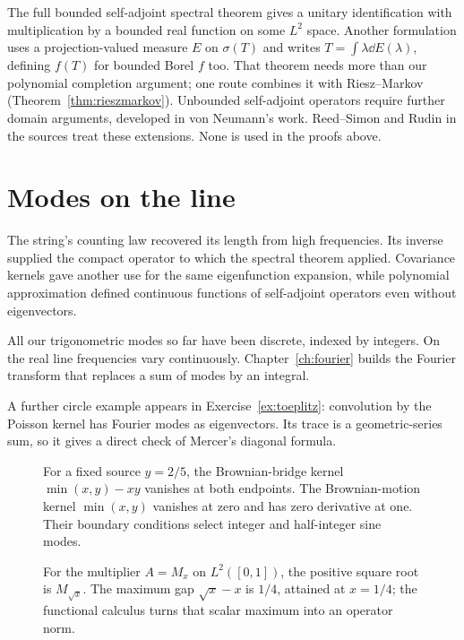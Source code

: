 \begin{remark}
The full bounded self-adjoint spectral theorem gives a unitary identification with multiplication by a bounded real function on some $L^2$ space. Another formulation uses a projection-valued measure $E$ on $\sigma(T)$ and writes $T=\int\lambda\dd E(\lambda)$, defining $f(T)$ for bounded Borel $f$ too. That theorem needs more than our polynomial completion argument; one route combines it with Riesz--Markov (Theorem~\ref{thm:rieszmarkov}). Unbounded self-adjoint operators require further domain arguments, developed in von Neumann's work. Reed--Simon and Rudin in the sources treat these extensions. None is used in the proofs above.
\end{remark}

\section{Modes on the line}

The string's counting law recovered its length from high frequencies. Its inverse supplied the compact operator to which the spectral theorem applied. Covariance kernels gave another use for the same eigenfunction expansion, while polynomial approximation defined continuous functions of self-adjoint operators even without eigenvectors.

All our trigonometric modes so far have been discrete, indexed by integers. On the real line frequencies vary continuously. Chapter~\ref{ch:fourier} builds the Fourier transform that replaces a sum of modes by an integral.

A further circle example appears in Exercise~\ref{ex:toeplitz}: convolution by the Poisson kernel has Fourier modes as eigenvectors. Its trace is a geometric-series sum, so it gives a direct check of Mercer's diagonal formula.


\begin{figure}[ht]
\centering{}
\caption{For a fixed source $y=2/5$, the Brownian-bridge kernel $\min(x,y)-xy$ vanishes at both endpoints. The Brownian-motion kernel $\min(x,y)$ vanishes at zero and has zero derivative at one. Their boundary conditions select integer and half-integer sine modes.}
\label{fig:v8c09boundaries}
\end{figure}
\begin{figure}[ht]
\centering{}
\caption{For the multiplier $A=M_x$ on $L^2([0,1])$, the positive square root is $M_{\sqrt x}$. The maximum gap $\sqrt x-x$ is $1/4$, attained at $x=1/4$; the functional calculus turns that scalar maximum into an operator norm.}
\label{fig:v8c09calculus}
\end{figure}

